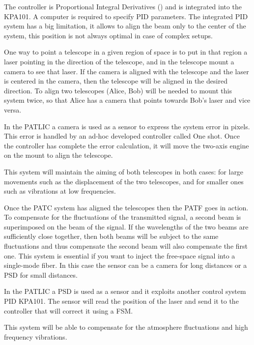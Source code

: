 The  controller is Proportional Integral Derivatives () and is integrated into the KPA101. A computer is required to specify PID parameters. The integrated PID system has a big limitation, it allows to align the beam only to the center of the system, this position is not always optimal in case of complex setups.




One way to point a telescope in a given region of space is to put in that region a laser pointing in the direction of the telescope, and in the telescope mount a camera to see that laser.
If the camera is aligned with the telescope and the laser is centered in the camera, then the telescope will be aligned in the desired direction.
To align two telescopes (Alice, Bob) will be needed to mount this system twice, so that Alice has a camera that points towards Bob’s laser and vice versa.

In the PATLIC a camera is used as a sensor to express the system error in pixels. This error is handled by an ad-hoc developed controller called One shot. Once the controller has complete the error calculation, it will move the two-axis engine on the mount to align the telescope.

This system will maintain the aiming of both telescopes in both cases: for large movements such as the displacement of the two telescopes, and for smaller ones such as vibrations at low frequencies.


Once the PATC system has aligned the telescopes then the PATF goes in action. To compensate for the fluctuations of the transmitted signal, a second beam is superimposed on the beam of the signal. If the wavelengths of the two beams are sufficiently close together, then both beams will be subject to the same fluctuations and thus compensate the second beam will also compensate the first one.
This system is essential if you want to inject the free-space signal into a single-mode fiber. In this case the sensor can be a camera for long distances or a PSD for small distances.

In the PATLIC a PSD is used as a sensor and it exploits another control system PID KPA101. The sensor will read the position of the laser and send it to the controller that will correct it using a FSM.

This system will be able to compensate for the atmosphere fluctuations and high frequency vibrations.